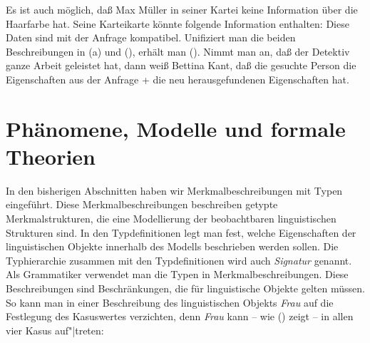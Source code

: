 Es ist auch möglich, daß Max Müller in seiner Kartei keine Information über die Haarfarbe hat. Seine Karteikarte
könnte folgende Information enthalten:
\ea
{}
\z
Diese Daten sind mit der Anfrage kompatibel. Unifiziert man die beiden Beschreibungen in (a) und (),
erhält man (). Nimmt man an, daß der Detektiv ganze Arbeit geleistet hat, dann weiß Bettina Kant,
daß die gesuchte Person die Eigenschaften aus der Anfrage + die neu herausgefundenen Eigenschaften hat.

\section{Phänomene, Modelle und formale Theorien}
\label{sec-modelle-theorien}

In den bisherigen Abschnitten haben wir Merkmalbeschreibungen mit Typen eingeführt. Diese
Merkmalbeschreibungen beschreiben getypte Merkmalstrukturen, die eine Modellierung der beobachtbaren
linguistischen Strukturen sind. In den Typdefinitionen legt man fest, welche
Eigenschaften der linguistischen Objekte innerhalb des Modells beschrieben werden sollen. Die Typhierarchie zusammen mit den Typdefinitionen wird
auch \emph{Signatur} genannt. %
Als Grammatiker verwendet man die Typen in
Merkmalbeschreibungen. Diese Beschreibungen sind Beschränkungen, die für linguistische Objekte
gelten müssen. So kann man \zb in einer Beschreibung des linguistischen Objekts \emph{Frau} auf die
Festlegung des Kasuswertes verzichten, denn \emph{Frau} kann -- wie () zeigt -- in allen vier
Kasus auf"|treten:

